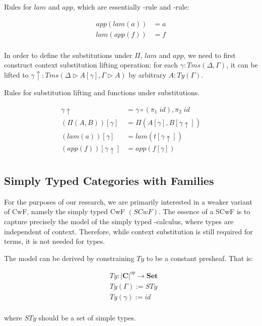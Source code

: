 {Rules for $lam$ and $app$, which are essentially \beta-rule and \eta-rule:

\begin{align*}
  app (lam (a)) & = a \\
  lam (app (f)) & = f \\
\end{align*}

In order to define the substitutions under $\Pi$, $lam$ and $app$, we need to first construct context substitution lifting operation: for each $\gamma : Tms (\Delta, \Gamma)$, it can be lifted to $\gamma \uparrow : Tms (\Delta \triangleright A [\gamma], \Gamma \triangleright A)$ by arbitrary $A : Ty(\Gamma)$.

Rules for substitution lifting and functions under substitutions.

\begin{align*}
  \gamma \uparrow & = \gamma \circ (\pi_1\;id) , \pi_2\;id \\
  (\Pi(A,B)) [\gamma] &= \Pi (A [\gamma], B [\gamma \uparrow]) \\
  (lam (a)) [\gamma] &= lam (t [\gamma \uparrow]) \\
  (app (f)) [\gamma \uparrow] &= app (f [\gamma]) \\
\end{align*}

\subsection{Simply Typed Categories with Families}

For the purposes of our research, we are primarily interested in a weaker variant of CwF, namely the simply typed CwF $(SCwF)$. The essence of a SCwF is to capture precisely the model of the simply typed \lambda-calculus, where types are independent of context. Therefore, while context substitution is still required for terms, it is not needed for types.

The model can be derived by constraining $Ty$ to be a constant presheaf. That is:

\begin{align*}
  & Ty : \lvert\textbf{C}\rvert^{op} \to \textbf{Set} \\
  & Ty(\Gamma) := STy \\
  & Ty(\gamma) := id \\
\end{align*}

where $STy$ should be a set of simple types.

}
